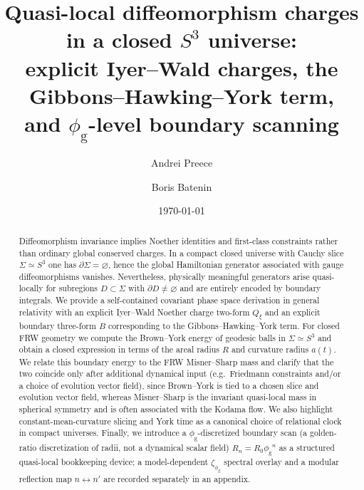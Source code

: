 \documentclass[
  reprint,
  amsmath,amssymb,
  aps,
  prd,
  superscriptaddress,
  nofootinbib,
  longbibliography
]{revtex4-2}
\newcommand{\goldconst}{\ensuremath{\phi_{\!\mathrm{g}}}} %
\newcommand{\Sthree}{\ensuremath{S^3}}
\begin{document}
\title{\texorpdfstring{Quasi-local diffeomorphism charges in a closed $\Sthree$ universe:\\
explicit Iyer--Wald charges, the Gibbons--Hawking--York term,\\
and $\goldconst$-level boundary scanning}{Quasi-local diffeomorphism charges in a closed S^3 universe: explicit Iyer--Wald charges, the Gibbons--Hawking--York term, and golden-ratio level boundary scanning}}
\author{Andrei Preece}
\author{Boris Batenin}
\date{\today}
\begin{abstract}
Diffeomorphism invariance implies Noether identities and first-class constraints rather than ordinary global conserved charges.
In a compact closed universe with Cauchy slice $\Sigma \simeq S^{3}$ one has $\partial\Sigma=\varnothing$, hence the global Hamiltonian generator associated with gauge diffeomorphisms vanishes.
Nevertheless, physically meaningful generators arise quasi-locally for subregions $D\subset\Sigma$ with $\partial D\neq\varnothing$ and are entirely encoded by boundary integrals.
We provide a self-contained covariant phase space derivation in general relativity with an explicit Iyer--Wald Noether charge two-form $Q_\xi$ and an explicit boundary three-form $B$ corresponding to the Gibbons--Hawking--York term.
For closed FRW geometry we compute the Brown--York energy of geodesic balls in $\Sigma\simeq S^{3}$ and obtain a closed expression in terms of the areal radius $R$ and curvature radius $a(t)$.
We relate this boundary energy to the FRW Misner--Sharp mass and clarify that the two coincide only after additional dynamical input (e.g.\ Friedmann constraints and/or a choice of evolution vector field), since Brown--York is tied to a chosen slice and evolution vector field, whereas Misner--Sharp is the invariant quasi-local mass in spherical symmetry and is often associated with the Kodama flow.\cite{Kodama1980,Hayward1996}
We also highlight constant-mean-curvature slicing and York time as a canonical choice of relational clock in compact universes.
Finally, we introduce a $\goldconst$-discretized boundary scan (a golden-ratio discretization of radii, not a dynamical scalar field) $R_n = R_0\goldconst^{n}$ as a structured quasi-local bookkeeping device; a model-dependent $\zeta_{\goldconst}$ spectral overlay and a modular reflection map $n\leftrightarrow n'$ are recorded separately in an appendix.
\end{abstract}
\maketitle
\end{document}
